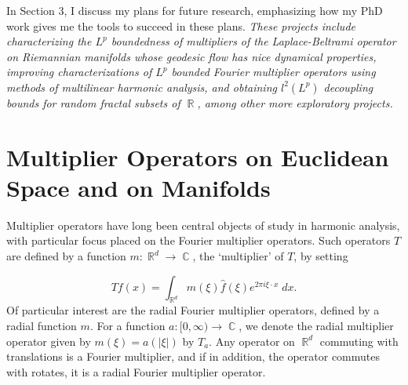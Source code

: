 \documentclass[11pt]{article}
\DeclareMathOperator{\RR}{\mathbb{R}}
\DeclareMathOperator{\CC}{\mathbb{C}}
\begin{document}

In Section 3, I discuss my plans for future research, emphasizing how my PhD work gives me the tools to succeed in these plans. \emph{These projects include characterizing the $L^p$ boundedness of multipliers of the Laplace-Beltrami operator on Riemannian manifolds whose geodesic flow has nice dynamical properties, improving characterizations of $L^p$ bounded Fourier multiplier operators using methods of multilinear harmonic analysis, and obtaining $l^2(L^p)$ decoupling bounds for random fractal subsets of $\RR$, among other more exploratory projects.}

\section{Multiplier Operators on Euclidean Space and on Manifolds} \label{Section1}



Multiplier operators have long been central objects of study in harmonic analysis, with particular focus placed on the Fourier multiplier operators. Such operators $T$ are defined by a function $m: \RR^d \to \CC$, the `multiplier' of $T$, by setting

%
\[ Tf(x) = \int_{\RR^d} m(\xi) \widehat{f}(\xi) e^{2 \pi i \xi \cdot x}\; dx. \]
%
Of particular interest are the radial Fourier multiplier operators, defined by a radial function $m$. For a function $a: [0,\infty) \to \CC$, we denote the radial multiplier operator given by $m(\xi) = a(|\xi|)$ by $T_a$. Any operator on $\RR^d$ commuting with translations is a Fourier multiplier, and if in addition, the operator commutes with rotates, it is a radial Fourier multiplier operator. %
\end{document}
